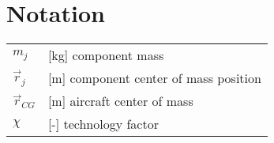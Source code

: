 \clearpage %
{}
\chapter*{Notation}
\markright{}

\begin{longtable}[l]{ l p{} }
  $m_j$          & [kg] component mass \\
  $\vec{r}_j$    & [m] component center of mass position \\
  $\vec{r}_{CG}$ & [m] aircraft center of mass \\
  $\chi$         & [-] technology factor \\
\end{longtable}
